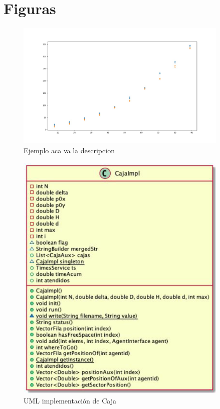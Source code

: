 \documentclass{article}
\begin{document}
\clearpage

\section{Figuras}
\begin{figure}[h]
\begin{center}
\includegraphics[width=4in]{./images/inputVsOutput.jpeg}
\caption{Ejemplo aca va la descripcion }
\label{grafico}
\end{center}
\end{figure}

\begin{figure}[h]
\begin{center}
\includegraphics[width=4in]{./images/claseCajaImpl.PNG}
\caption{UML implementación de Caja }
\label{cajaImpl}
\end{center}
\end{figure}
\end{document}
